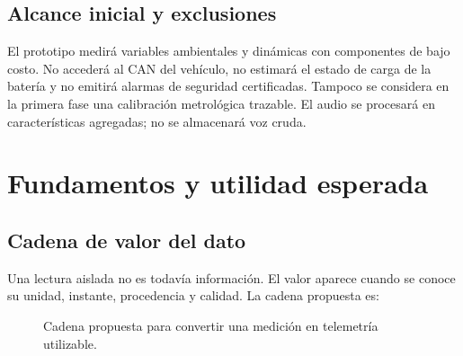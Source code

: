 \documentclass[11pt,a4paper,oneside]{report}
\begin{document}
\section{Alcance inicial y exclusiones}
El prototipo medirá variables ambientales y dinámicas con componentes de bajo costo.
No accederá al CAN del vehículo, no estimará el estado de carga de la batería y no
emitirá alarmas de seguridad certificadas. Tampoco se considera en la primera fase una
calibración metrológica trazable. El audio se procesará en características agregadas;
no se almacenará voz cruda.

\chapter{Fundamentos y utilidad esperada}

\section{Cadena de valor del dato}
Una lectura aislada no es todavía información. El valor aparece cuando se conoce su
unidad, instante, procedencia y calidad. La cadena propuesta es:

\begin{figure}[H]
\centering
{}
\caption{Cadena propuesta para convertir una medición en telemetría utilizable.}
\end{figure}
\end{document}

